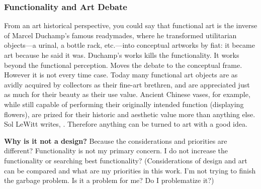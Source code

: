 \subsubsection{Functionality and Art Debate}
From an art historical perspective, you could say that functional art is the inverse of Marcel Duchamp's famous readymades, where he transformed utilitarian objects---a urinal, a bottle rack, etc.---into conceptual artworks by fiat: it became art because he said it was. Duchamp's works kills the functionality. It works beyond the functional perception. Moves the debate to the conceptual frame. However it is not every time case. Today many functional art objects are as avidly acquired by collectors as their fine-art brethren, and are appreciated just as much for their beauty as their use value. Ancient Chinese vases, for example, while still capable of performing their originally intended function (displaying flowers), are prized for their historic and aesthetic value more than anything else.  Sol LeWitt writes,  \cite{lewitt1967paragraphs}. Therefore anything can be turned to art with a good idea. 


\textbf{Why is it not a design?} Because the considerations and priorities are different? Functionality is not my primary concern. I do not increase the functionality or searching best functionality? (Considerations of design and art can be compared and what are my priorities in this work. I'm not trying to finish the garbage problem. Is it a problem for me? Do I problematize it?) 

